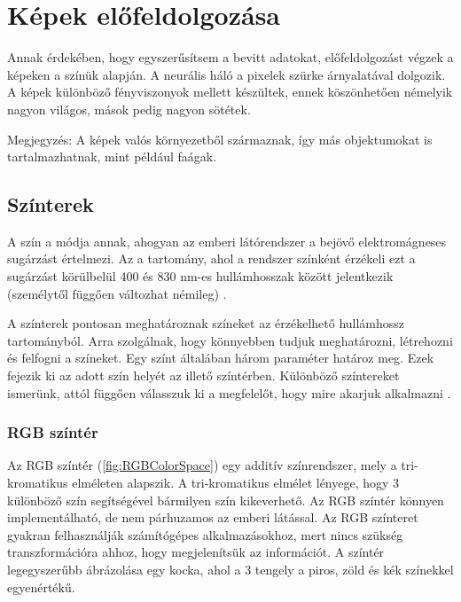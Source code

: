 \chapter{Képek előfeldolgozása}\label{ch:PREPROC}

\begin{osszefoglal}
Annak érdekében, hogy egyszerűsítsem a bevitt adatokat, előfeldolgozást végzek a képeken a színük alapján. A neurális háló a pixelek szürke árnyalatával dolgozik. 
A képek különböző fényviszonyok mellett készültek, ennek köszönhetően némelyik nagyon világos, mások pedig nagyon sötétek.

Megjegyzés: A képek valós környezetből származnak, így más objektumokat is tartalmazhatnak, mint például faágak.

\end{osszefoglal}

\section{Színterek}\label{sec:PREPROC:colorSpaces}

A szín a módja annak, ahogyan az emberi látórendszer a bejövő elektromágneses sugárzást értelmezi. Az a tartomány, ahol a rendszer színként érzékeli ezt a sugárzást körülbelül 400 és 830 nm-es hullámhosszak között jelentkezik (személytől függően változhat némileg) \cite{17}. 

A színterek pontosan meghatároznak színeket az érzékelhető hullámhossz tartományból. 
Arra szolgálnak, hogy könnyebben tudjuk meghatározni, létrehozni és felfogni a színeket. Egy színt általában három paraméter határoz meg. Ezek fejezik ki az adott szín helyét az illető színtérben. Különböző színtereket ismerünk, attól függően válasszuk ki a megfelelőt, hogy mire akarjuk alkalmazni \cite{4}. 






\subsection{RGB színtér}\label{sec:PREPROC:rgb}

Az RGB színtér (\ref{fig:RGBColorSpace}) egy additív színrendszer, mely a tri-kromatikus elméleten alapszik. A tri-kromatikus elmélet lényege, hogy 3 különböző szín segítségével bármilyen szín kikeverhető.  
Az RGB színtér könnyen implementálható, de nem párhuzamos az emberi látással. Az RGB színteret gyakran felhasználják számítógépes alkalmazásokhoz, mert nincs szükség transzformációra ahhoz, hogy megjelenítsük az információt. A színtér legegyszerűbb ábrázolása egy kocka, ahol a 3 tengely a piros, zöld és kék színekkel egyenértékű. 


